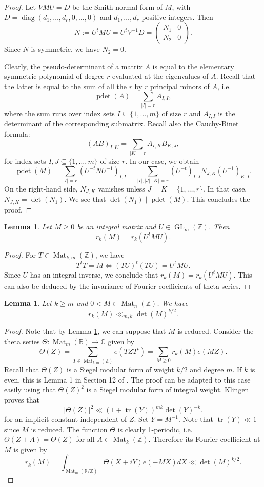 \documentclass[oneside]{amsart}
\numberwithin{equation}{section}
\newtheorem{lemma}[theorem]{Lemma}
\theoremstyle{definition}
\theoremstyle{remark}
\theoremstyle{remark}
\newcommand{\CC}{\mathbb C}								%
\newcommand{\RR}{\mathbb R}
\newcommand{\ZZ}{\mathbb Z}
\newcommand{\abs}[1]{\left\lvert #1\right\rvert}
\newcommand{\divides}{\mid}
\DeclareMathOperator{\Mat}{Mat}
\DeclareMathOperator{\GL}{GL}
\DeclareMathOperator{\diag}{diag}						%
\DeclareMathOperator{\tr}{tr}
\DeclareMathOperator{\pdet}{pdet}
\newcommand{\pmatrixtwo}[4]{\begin{pmatrix}#1&#2\\#3&#4\end{pmatrix}}
\begin{document}
\begin{proof}
Let $VMU=D$ be the Smith normal form of $M$, with $D=\diag(d_1,\dots,d_r,0,\dots,0)$ and $d_1,\dots,d_r$ positive integers. Then
$$N:=U^tMU=U^tV^{-1}D=\pmatrixtwo{N_1}0{N_2}0.$$
Since $N$ is symmetric, we have $N_2=0$.

Clearly, the pseudo-determinant of a matrix $A$ is equal to the elementary symmetric polynomial of degree $r$ evaluated at the eigenvalues of $A$. Recall that the latter is equal to the sum of all the $r$ by $r$ principal minors of $A$, i.e.
$$\pdet(A)=\sum_{\abs I=r}A_{I,I},$$
where the sum runs over index sets $I\subseteq\{1,\dots,m\}$ of size $r$ and $A_{I,I}$ is the determinant of the corresponding submatrix. Recall also the Cauchy-Binet formula:
$$(AB)_{I,K}=\sum_{\abs K=r}A_{I,K}B_{K,J},$$
for index sets $I,J\subseteq\{1,\dots,m\}$ of size $r$. In our case, we obtain
$$\pdet(M)=\sum_{\abs I=r}(U^{-t}NU^{-1})_{I,I}=\sum_{\abs I,\abs J,\abs K=r}(U^{-t})_{I,J}N_{J,K}(U^{-1})_{K,I}.$$
On the right-hand side, $N_{J,K}$ vanishes unless $J=K=\{1,\dots,r\}$. In that case, $N_{J,K}=\det(N_1)$. We see that $\det(N_1)\divides\pdet(M)$. This concludes the proof.
\end{proof}

\begin{lemma}\label{lem reduction of r_k(M)}
Let $M\geq0$ be an integral matrix and $U\in\GL_m(\ZZ)$. Then
$$r_k(M)=r_k(U^tMU).$$
\end{lemma}

\begin{proof}
For $T\in\Mat_{k,m}(\ZZ)$, we have
$$T^tT=M\Leftrightarrow (TU)^t(TU)=U^tMU.$$
Since $U$ has an integral inverse, we conclude that $r_k(M)=r_k(U^tMU)$. This can also be deduced by the invariance of Fourier coefficients of theta series.
\end{proof}

\begin{lemma}\label{lem bound r_k(M) for non-singular}
Let $k\geq m$ and $0<M\in\Mat_n(\ZZ)$. We have
$$r_k(M)\ll_{m,k}\det(M)^{k/2}.$$
\end{lemma}

\begin{proof}
Note that by Lemma \ref{lem reduction of r_k(M)}, we can suppose that $M$ is reduced. Consider the theta series $\Theta:\Mat_m(\RR)\to\CC$ given by
$$\Theta(Z)=\sum_{T\in\Mat_{k,m}(\ZZ)}e(TZT^t)=\sum_{M\geq0}r_k(M)e(MZ).$$
Recall that $\Theta(Z)$ is a Siegel modular form of weight $k/2$ and degree $m$. If $k$ is even, this is Lemma 1 in Section 12 of \cite{Kli90}. The proof can be adapted to this case easily using that $\Theta(Z)^2$ is a Siegel modular form of integral weight. Klingen proves that
$$\abs{\Theta(Z)}^2\ll(1+\tr(Y))^{mk}\det(Y)^{-k}.$$
for an implicit constant independent of $Z$. Set $Y=M^{-1}$. Note that $\tr(Y)\ll1$ since $M$ is reduced. The function $\Theta$ is clearly 1-periodic, i.e. $\Theta(Z+A)=\Theta(Z)$ for all $A\in\Mat_k(\ZZ)$. Therefore its Fourier coefficient at $M$ is given by
$$r_k(M)=\int_{\Mat_m(\RR/\ZZ)}\Theta(X+iY)e(-MX)dX\ll\det(M)^{k/2}.$$
\end{proof}
\end{document}
